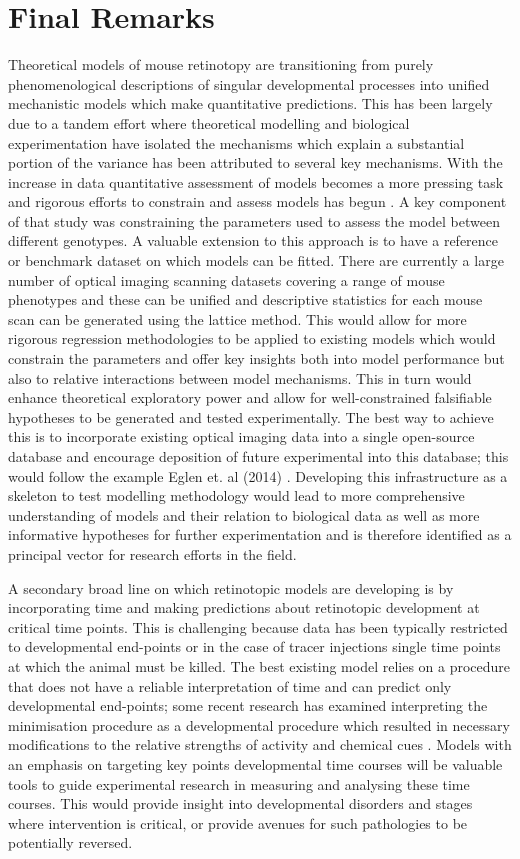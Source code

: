 \section{Final Remarks}
Theoretical models of mouse retinotopy are transitioning from purely phenomenological descriptions of singular developmental processes into unified mechanistic models which make quantitative predictions. This has been largely due to a tandem effort where theoretical modelling and biological experimentation have isolated the mechanisms which explain a substantial portion of the variance has been attributed to several key mechanisms. With the increase in data quantitative assessment of models becomes a more pressing task and rigorous efforts to constrain and assess models has begun \cite{Hjorth2015-le}. A key component of that study was constraining the parameters used to assess the model between different genotypes. A valuable extension to this approach is to have a reference or benchmark dataset on which models can be fitted. There are currently a large number of optical imaging scanning datasets covering a range of mouse phenotypes and these can be unified and descriptive statistics for each mouse scan can be generated using the lattice method. This would allow for more rigorous regression methodologies to be applied to existing models which would constrain the parameters and offer key insights both into model performance but also to relative interactions between model mechanisms. This in turn would enhance theoretical exploratory power and allow for well-constrained falsifiable hypotheses to be generated and tested experimentally. The best way to achieve this is to incorporate existing optical imaging data into a single open-source database and encourage deposition of future experimental into this database; this would follow the example Eglen et. al (2014) \cite{Eglen2014-fo}. Developing this infrastructure as a skeleton to test modelling methodology would lead to more comprehensive understanding of models and their relation to biological data as well as more informative hypotheses for further experimentation and is therefore identified as a principal vector for research efforts in the field. 

A secondary broad line on which retinotopic models are developing is by incorporating time and making predictions about retinotopic development at critical time points. This is challenging because data has been typically restricted to developmental end-points or in the case of tracer injections single time points at which the animal must be killed. The best existing model relies on a procedure that does not have a reliable interpretation of time and can predict only developmental end-points; some recent research has examined interpreting the minimisation procedure as a developmental procedure which resulted in necessary modifications to the relative strengths of activity and chemical cues \cite{Lyngholm2019-fs}. Models with an emphasis on targeting key points developmental time courses will be valuable tools to guide experimental research in measuring and analysing these time courses. This would provide insight into developmental disorders and stages where intervention is critical, or provide avenues for such pathologies to be potentially reversed.